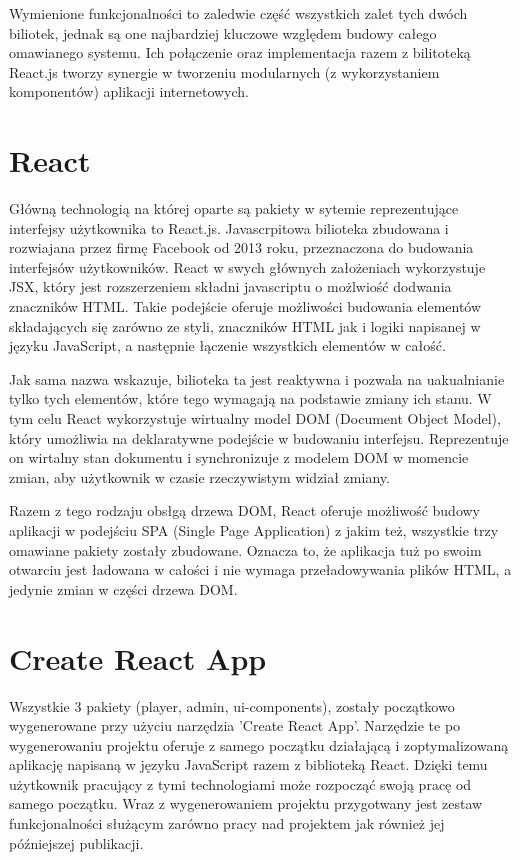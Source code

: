Wymienione funkcjonalności to zaledwie część wszystkich zalet tych dwóch biliotek, jednak są one najbardziej kluczowe względem budowy całego omawianego systemu. Ich połączenie oraz implementacja razem z bilitoteką React.js tworzy synergie w tworzeniu modularnych (z wykorzystaniem komponentów) aplikacji internetowych. 

\label{ch:frontend:react}
\section{React}
Główną technologią na której oparte są pakiety w sytemie reprezentujące interfejsy użytkownika to React.js. Javascrpitowa bilioteka zbudowana i rozwiajana przez firmę Facebook od 2013 roku, przeznaczona do budowania interfejsów użytkowników. React w swych głównych założeniach wykorzystuje JSX, który jest rozszerzeniem składni javascriptu o możlwiość dodwania znaczników HTML. Takie podejście oferuje możliwości budowania elementów składających się zarówno ze styli, znaczników HTML jak i logiki napisanej w języku JavaScript, a następnie łączenie wszystkich elementów w całość.

Jak sama nazwa wskazuje, bilioteka ta jest reaktywna i pozwala na uakualnianie tylko tych elementów, które tego wymagają na podstawie zmiany ich stanu. W tym celu React wykorzystuje wirtualny model DOM (Document Object Model), który umożliwia na deklaratywne podejście w budowaniu interfejsu. Reprezentuje on wirtalny stan dokumentu i synchronizuje z modelem DOM w momencie zmian, aby użytkownik w czasie rzeczywistym widział zmiany.

Razem z tego rodzaju obsłgą drzewa DOM, React oferuje możliwość budowy aplikacji w podejściu SPA (Single Page Application) z jakim też, wszystkie trzy omawiane pakiety zostały zbudowane. Oznacza to, że aplikacja tuż po swoim otwarciu jest ładowana w całości i nie wymaga przeładowywania plików HTML, a jedynie zmian w części drzewa DOM.

\section{Create React App}
Wszystkie 3 pakiety (player, admin, ui-components), zostały początkowo wygenerowane przy użyciu narzędzia 'Create React App'. Narzędzie te po wygenerowaniu projektu oferuje z samego początku działającą i zoptymalizowaną aplikację napisaną w języku JavaScript razem z biblioteką React. Dzięki temu użytkownik pracujący z tymi technologiami może rozpocząć swoją pracę od samego początku. Wraz z wygenerowaniem projektu przygotwany jest zestaw funkcjonalności służącym zarówno pracy nad projektem jak również jej późniejszej publikacji.

